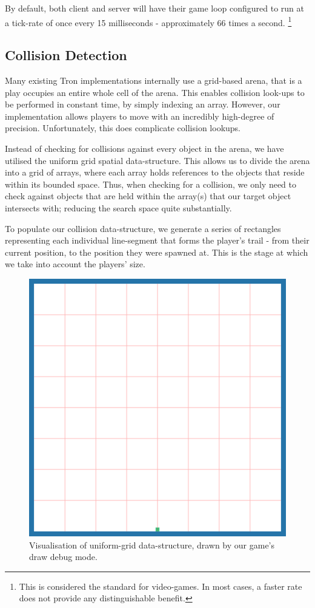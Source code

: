 \documentclass{standalone}
\begin{document}
		By default, both client and server will have their game loop configured to run at a tick-rate of once every 15 milliseconds - approximately 66 times a second. \footnote{This is considered the standard for video-games. In most cases, a faster rate does not provide any distinguishable benefit.}

		\subsection{Collision Detection} \label{sec:collisionDetection}
			Many existing Tron implementations internally use a grid-based arena, that is a play occupies an entire whole cell of the arena. This enables collision look-ups to be performed in constant time, by simply indexing an array. However, our implementation allows players to move with an incredibly high-degree of precision\parencite{JsNumbers}. Unfortunately, this does complicate collision lookups.

			Instead of checking for collisions against every object in the arena, we have utilised the uniform grid spatial data-structure. This allows us to divide the arena into a grid of arrays, where each array holds references to the objects that reside within its bounded space. Thus, when checking for a collision, we only need to check against objects that are held within the array(s) that our target object intersects with; reducing the search space quite substantially.

			To populate our collision data-structure, we generate a series of rectangles representing each individual line-segment that forms the player's trail - from their current position, to the position they were spawned at. This is the stage at which we take into account the players' size.

			\begin{figure}[!htbp]
				\centering
				\includegraphics[width=.8\textwidth]{resources/images/uniformgrid.png}
				\caption{Visualisation of uniform-grid data-structure, drawn by our game's draw debug mode.}
			\end{figure}
			\FloatBarrier
\end{document}
